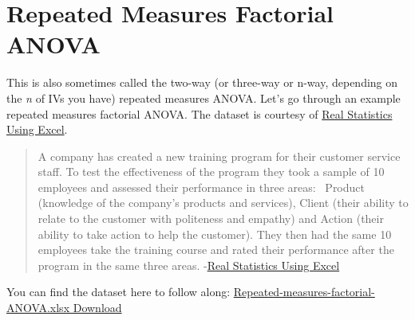 \documentclass[
]{book}
\begin{document}
\hypertarget{repeated-measures-factorial-anova}{%
\section{Repeated Measures Factorial ANOVA}\label{repeated-measures-factorial-anova}}

This is also sometimes called the two-way (or three-way or n-way, depending on the \emph{n} of IVs you have) repeated measures ANOVA. Let's go through an example repeated measures factorial ANOVA. The dataset is courtesy of \href{https://www.real-statistics.com/anova-repeated-measures/two-within-subjects-factors/}{Real Statistics Using Excel}.

\begin{quote}
A company has created a new training program for their customer service staff. To test the effectiveness of the program they took a sample of 10 employees and assessed their performance in three areas: ~Product (knowledge of the company's products and services), Client (their ability to relate to the customer with politeness and empathy) and Action (their ability to take action to help the customer). They then had the same 10 employees take the training course and rated their performance after the program in the same three areas. -\href{A\%20company\%20has\%20created\%20a\%20new\%20training\%20program\%20for\%20their\%20customer\%20service\%20staff.\%20To\%20test\%20the\%20effectiveness\%20of\%20the\%20program\%20they\%20took\%20a\%20sample\%20of\%2010\%20employees\%20and\%20assessed\%20their\%20performance\%20in\%20three\%20areas:\%20Product\%20(knowledge\%20of\%20the\%20company’s\%20products\%20and\%20services),\%20Client\%20(their\%20ability\%20to\%20relate\%20to\%20the\%20customer\%20with\%20politeness\%20and\%20empathy)\%20and\%20Action\%20(their\%20ability\%20to\%20take\%20action\%20to\%20help\%20the\%20customer).\%20They\%20then\%20had\%20the\%20same\%2010\%20employees\%20take\%20the\%20training\%20course\%20and\%20rated\%20their\%20performance\%20after\%20the\%20program\%20in\%20the\%20same\%20three\%20areas.\%20Based\%20on\%20the\%20data\%20in\%20Figure\%201,\%20determine\%20whether\%20the\%20program\%20was\%20effective.}{Real Statistics Using Excel}
\end{quote}

You can find the dataset here to follow along: \href{https://github.com/danawanzer/stats-with-jamovi/blob/master/data/Repeated-measures-factorial-ANOVA.xlsx}{Repeated-measures-factorial-ANOVA.xlsx Download}
\end{document}
